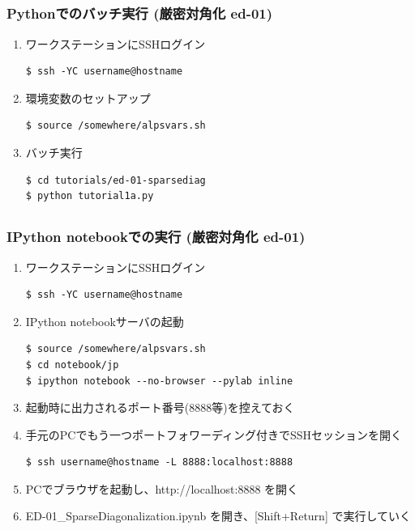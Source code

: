 \subsection*{\redm\whitem\greenb}
\begin{frame}[t,fragile]
  \frametitle{Pythonでのバッチ実行 (厳密対角化 ed-01)}
  \begin{enumerate}
  \item ワークステーションにSSHログイン
\begin{lstlisting}
$ ssh -YC username@hostname
\end{lstlisting}
  \item 環境変数のセットアップ
\begin{lstlisting}
$ source /somewhere/alpsvars.sh
\end{lstlisting}
  \item バッチ実行
\begin{lstlisting}
$ cd tutorials/ed-01-sparsediag
$ python tutorial1a.py
\end{lstlisting}
  \end{enumerate}
\end{frame}

\subsection*{\redm\whitem\greenb}
\begin{frame}[t,fragile,shrink=10]
  \frametitle{IPython notebookでの実行 (厳密対角化 ed-01)}
  \begin{enumerate}
  \item ワークステーションにSSHログイン
\begin{lstlisting}
$ ssh -YC username@hostname
\end{lstlisting}
  \item IPython notebookサーバの起動
\begin{lstlisting}
$ source /somewhere/alpsvars.sh
$ cd notebook/jp
$ ipython notebook --no-browser --pylab inline
\end{lstlisting}
  \item 起動時に出力されるポート番号(8888等)を控えておく
  \item 手元のPCでもう一つポートフォワーディング付きでSSHセッションを開く
\begin{lstlisting}
$ ssh username@hostname -L 8888:localhost:8888
\end{lstlisting}
  \item PCでブラウザを起動し、http://localhost:8888 を開く
  \item ED-01\_SparseDiagonalization.ipynb を開き、[Shift+Return] で実行していく
  \end{enumerate}
\end{frame}

